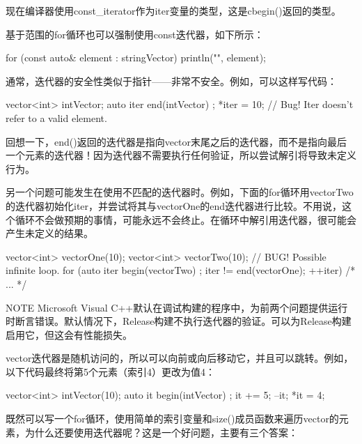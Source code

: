 现在编译器使用const\_iterator作为iter变量的类型，这是cbegin()返回的类型。

基于范围的for循环也可以强制使用const迭代器，如下所示：

\begin{cpp}
for (const auto& element : stringVector) {
    println("{}", element);
}
\end{cpp}


通常，迭代器的安全性类似于指针——非常不安全。例如，可以这样写代码：

\begin{cpp}
vector<int> intVector;
auto iter { end(intVector) };
*iter = 10; // Bug! Iter doesn't refer to a valid element.
\end{cpp}

回想一下，end()返回的迭代器是指向vector末尾之后的迭代器，而不是指向最后一个元素的迭代器！因为迭代器不需要执行任何验证，所以尝试解引将导致未定义行为。

另一个问题可能发生在使用不匹配的迭代器时。例如，下面的for循环用vectorTwo的迭代器初始化iter，并尝试将其与vectorOne的end迭代器进行比较。不用说，这个循环不会做预期的事情，可能永远不会终止。在循环中解引用迭代器，很可能会产生未定义的结果。

\begin{cpp}
vector<int> vectorOne(10);
vector<int> vectorTwo(10);
// BUG! Possible infinite loop.
for (auto iter { begin(vectorTwo) }; iter != end(vectorOne); ++iter) { /* ... */ }
\end{cpp}

\begin{myNotic}{NOTE}
Microsoft Visual C++默认在调试构建的程序中，为前两个问题提供运行时断言错误。默认情况下，Release构建不执行迭代器的验证。可以为Release构建启用它，但这会有性能损失。
\end{myNotic}


vector迭代器是随机访问的，所以可以向前或向后移动它，并且可以跳转。例如，以下代码最终将第5个元素（索引4）更改为值4：

\begin{cpp}
vector<int> intVector(10);
auto it { begin(intVector) };
it += 5;
--it;
*it = 4;
\end{cpp}


既然可以写一个for循环，使用简单的索引变量和size()成员函数来遍历vector的元素，为什么还要使用迭代器呢？这是一个好问题，主要有三个答案：

